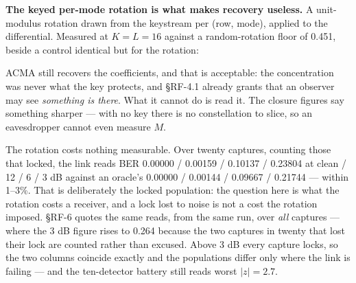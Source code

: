 \documentclass[10pt,letterpaper,twocolumn]{article}
\begin{document}
\textbf{The keyed per-mode rotation is what makes recovery useless.} A unit-modulus rotation drawn from the keystream per (row, mode), applied to the differential. Measured at \(K=L=16\) against a random-rotation floor of 0.451, beside a control identical but for the rotation:


ACMA still recovers the coefficients, and that is acceptable: the concentration was never what the key protects, and §RF-4.1 already grants that an observer may see \emph{something is there}. What it cannot do is read it. The closure figures say something sharper --- with no key there is no constellation to slice, so an eavesdropper cannot even measure \(M\).

The rotation costs nothing measurable. Over twenty captures, counting those that locked, the link reads BER 0.00000 / 0.00159 / 0.10137 / 0.23804 at clean / 12 / 6 / 3 dB against an oracle's 0.00000 / 0.00144 / 0.09667 / 0.21744 --- within 1--3\%. That is deliberately the locked population: the question here is what the rotation costs a receiver, and a lock lost to noise is not a cost the rotation imposed. §RF-6 quotes the same reads, from the same run, over \emph{all} captures --- where the 3 dB figure rises to 0.264 because the two captures in twenty that lost their lock are counted rather than excused. Above 3 dB every capture locks, so the two columns coincide exactly and the populations differ only where the link is failing --- and the ten-detector battery still reads worst \(|z| = 2.7\).
\end{document}
